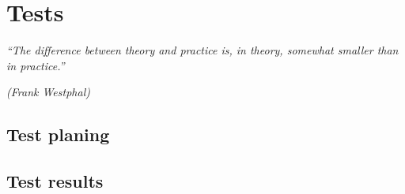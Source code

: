 \documentclass[tcc]{subfile}
\begin{document}
\chapter{Tests}
\label{ch:tests}
\epigraph{\em ``The difference between theory and practice is, in theory, somewhat
smaller than in practice.''}{\em (Frank Westphal)}

\section{Test planing}

\section{Test results}
\end{document}
